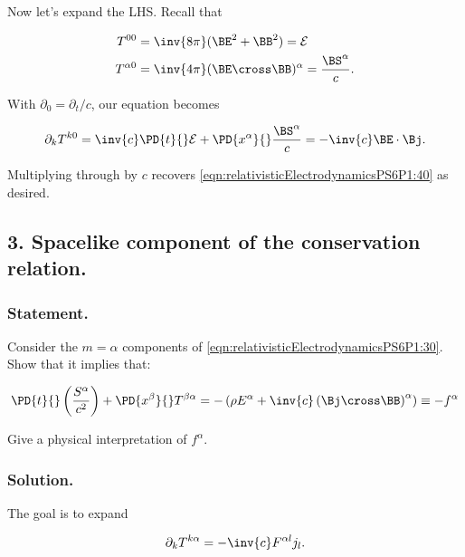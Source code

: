 Now let's expand the LHS.  Recall that

\begin{align}\label{eqn:relativisticElectrodynamicsPS6P1:180}
T^{ 0 0 } &= \inv{8 \pi} ( \BE^2 + \BB^2 ) = \mathcal{E} \\
T^{\alpha 0} &= \inv{4 \pi} (\BE \cross \BB)^\alpha = \frac{\BS^\alpha}{c}.
\end{align}

With $\partial_0 = \partial_t/c$, our equation becomes

\begin{equation}\label{eqn:relativisticElectrodynamicsPS6P1:160}
\partial_k T^{k 0} = \inv{c} \PD{t}{} \mathcal{E} + \PD{x^\alpha}{} \frac{\BS^\alpha}{c} = -\inv{c} \BE \cdot \Bj.
\end{equation}

Multiplying through by $c$ recovers \ref{eqn:relativisticElectrodynamicsPS6P1:40} as desired.

\subsection{3. Spacelike component of the conservation relation.}

\subsubsection{Statement.}

Consider the $m = \alpha$ components of \ref{eqn:relativisticElectrodynamicsPS6P1:30}.  Show that it implies that:

\begin{equation}\label{eqn:relativisticElectrodynamicsPS6P1:41}
\PD{t}{}\left( \frac{S^\alpha}{c^2} \right) + \PD{x^\beta}{} T^{\beta \alpha}
= - \left( \rho E^\alpha + \inv{c} \left( \Bj \cross \BB \right)^\alpha \right) \equiv - f^\alpha
\end{equation}

Give a physical interpretation of $f^\alpha$.

\subsubsection{Solution.}

The goal is to expand

\begin{equation}\label{eqn:relativisticElectrodynamicsPS6P1:42}
\partial_k T^{k \alpha} = -\inv{c} F^{\alpha l} j_l.
\end{equation}

